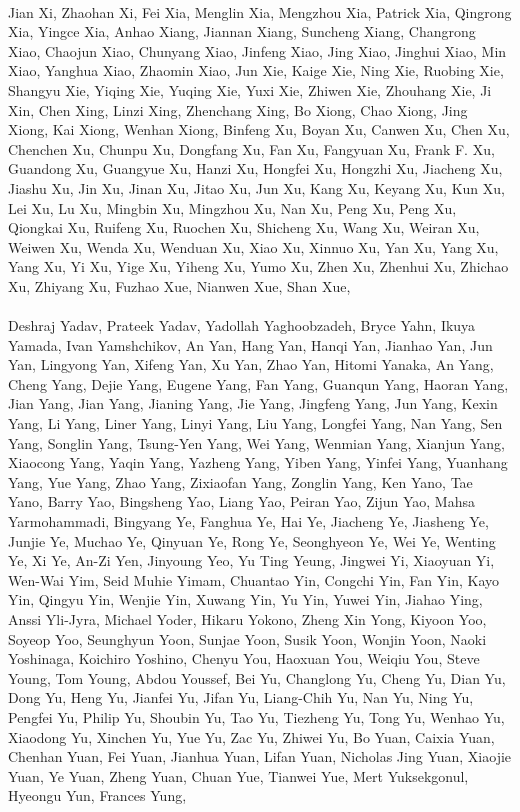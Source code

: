 \paragraph{}Jian Xi, Zhaohan Xi, Fei Xia, Menglin Xia, Mengzhou Xia, Patrick Xia, Qingrong Xia, Yingce Xia, Anhao Xiang, Jiannan Xiang, Suncheng Xiang, Changrong Xiao, Chaojun Xiao, Chunyang Xiao, Jinfeng Xiao, Jing Xiao, Jinghui Xiao, Min Xiao, Yanghua Xiao, Zhaomin Xiao, Jun Xie, Kaige Xie, Ning Xie, Ruobing Xie, Shangyu Xie, Yiqing Xie, Yuqing Xie, Yuxi Xie, Zhiwen Xie, Zhouhang Xie, Ji Xin, Chen Xing, Linzi Xing, Zhenchang Xing, Bo Xiong, Chao Xiong, Jing Xiong, Kai Xiong, Wenhan Xiong, Binfeng Xu, Boyan Xu, Canwen Xu, Chen Xu, Chenchen Xu, Chunpu Xu, Dongfang Xu, Fan Xu, Fangyuan Xu, Frank F. Xu, Guandong Xu, Guangyue Xu, Hanzi Xu, Hongfei Xu, Hongzhi Xu, Jiacheng Xu, Jiashu Xu, Jin Xu, Jinan Xu, Jitao Xu, Jun Xu, Kang Xu, Keyang Xu, Kun Xu, Lei Xu, Lu Xu, Mingbin Xu, Mingzhou Xu, Nan Xu, Peng Xu, Peng Xu, Qiongkai Xu, Ruifeng Xu, Ruochen Xu, Shicheng Xu, Wang Xu, Weiran Xu, Weiwen Xu, Wenda Xu, Wenduan Xu, Xiao Xu, Xinnuo Xu, Yan Xu, Yang Xu, Yang Xu, Yi Xu, Yige Xu, Yiheng Xu, Yumo Xu, Zhen Xu, Zhenhui Xu, Zhichao Xu, Zhiyang Xu, Fuzhao Xue, Nianwen Xue, Shan Xue,
\paragraph{}Deshraj Yadav, Prateek Yadav, Yadollah Yaghoobzadeh, Bryce Yahn, Ikuya Yamada, Ivan Yamshchikov, An Yan, Hang Yan, Hanqi Yan, Jianhao Yan, Jun Yan, Lingyong Yan, Xifeng Yan, Xu Yan, Zhao Yan, Hitomi Yanaka, An Yang, Cheng Yang, Dejie Yang, Eugene Yang, Fan Yang, Guanqun Yang, Haoran Yang, Jian Yang, Jian Yang, Jianing Yang, Jie Yang, Jingfeng Yang, Jun Yang, Kexin Yang, Li Yang, Liner Yang, Linyi Yang, Liu Yang, Longfei Yang, Nan Yang, Sen Yang, Songlin Yang, Tsung-Yen Yang, Wei Yang, Wenmian Yang, Xianjun Yang, Xiaocong Yang, Yaqin Yang, Yazheng Yang, Yiben Yang, Yinfei Yang, Yuanhang Yang, Yue Yang, Zhao Yang, Zixiaofan Yang, Zonglin Yang, Ken Yano, Tae Yano, Barry Yao, Bingsheng Yao, Liang Yao, Peiran Yao, Zijun Yao, Mahsa Yarmohammadi, Bingyang Ye, Fanghua Ye, Hai Ye, Jiacheng Ye, Jiasheng Ye, Junjie Ye, Muchao Ye, Qinyuan Ye, Rong Ye, Seonghyeon Ye, Wei Ye, Wenting Ye, Xi Ye, An-Zi Yen, Jinyoung Yeo, Yu Ting Yeung, Jingwei Yi, Xiaoyuan Yi, Wen-Wai Yim, Seid Muhie Yimam, Chuantao Yin, Congchi Yin, Fan Yin, Kayo Yin, Qingyu Yin, Wenjie Yin, Xuwang Yin, Yu Yin, Yuwei Yin, Jiahao Ying, Anssi Yli-Jyra, Michael Yoder, Hikaru Yokono, Zheng Xin Yong, Kiyoon Yoo, Soyeop Yoo, Seunghyun Yoon, Sunjae Yoon, Susik Yoon, Wonjin Yoon, Naoki Yoshinaga, Koichiro Yoshino, Chenyu You, Haoxuan You, Weiqiu You, Steve Young, Tom Young, Abdou Youssef, Bei Yu, Changlong Yu, Cheng Yu, Dian Yu, Dong Yu, Heng Yu, Jianfei Yu, Jifan Yu, Liang-Chih Yu, Nan Yu, Ning Yu, Pengfei Yu, Philip Yu, Shoubin Yu, Tao Yu, Tiezheng Yu, Tong Yu, Wenhao Yu, Xiaodong Yu, Xinchen Yu, Yue Yu, Zac Yu, Zhiwei Yu, Bo Yuan, Caixia Yuan, Chenhan Yuan, Fei Yuan, Jianhua Yuan, Lifan Yuan, Nicholas Jing Yuan, Xiaojie Yuan, Ye Yuan, Zheng Yuan, Chuan Yue, Tianwei Yue, Mert Yuksekgonul, Hyeongu Yun, Frances Yung,

